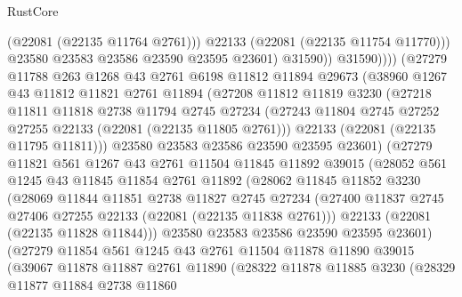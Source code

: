 \begin{lexlean}{RustCore}
\begin{coremodule}
                        (@22081 (@22135 @11764 @2761)))
                      @22133
                      (@22081 (@22135 @11754 @11770)))
                    @23580
                    @23583
                    @23586
                    @23590
                    @23595
                    @23601)
                  @31590))
              @31590))))
      (@27279
        @11788
        @263
        @1268
        @43
        @2761
        @6198
        @11812
        @11894
        @29673
        (@38960
          @1267
          @43
          @11812
          @11821
          @2761
          @11894
          (@27208
            @11812
            @11819
            @3230
            (@27218
              @11811
              @11818
              @2738
              @11794
              @2745
              @27234
              (@27243 @11804 @2745 @27252 @27255 @22133 (@22081 (@22135 @11805 @2761)))
              @22133
              (@22081 (@22135 @11795 @11811)))
            @23580
            @23583
            @23586
            @23590
            @23595
            @23601)
          (@27279
            @11821
            @561
            @1267
            @43
            @2761
            @11504
            @11845
            @11892
            @39015
            (@28052
              @561
              @1245
              @43
              @11845
              @11854
              @2761
              @11892
              (@28062
                @11845
                @11852
                @3230
                (@28069
                  @11844
                  @11851
                  @2738
                  @11827
                  @2745
                  @27234
                  (@27400 @11837 @2745 @27406 @27255 @22133 (@22081 (@22135 @11838 @2761)))
                  @22133
                  (@22081 (@22135 @11828 @11844)))
                @23580
                @23583
                @23586
                @23590
                @23595
                @23601)
              (@27279
                @11854
                @561
                @1245
                @43
                @2761
                @11504
                @11878
                @11890
                @39015
                (@39067
                  @11878
                  @11887
                  @2761
                  @11890
                  (@28322
                    @11878
                    @11885
                    @3230
                    (@28329
                      @11877
                      @11884
                      @2738
                      @11860

\end{coremodule}
\end{lexlean}
